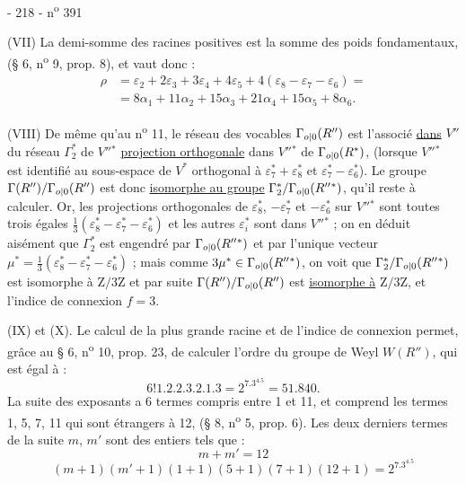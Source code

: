 - 218 - \hfill n\textsuperscript{o} 391

(VII) La demi-somme des racines positives est la somme des poids fondamentaux, (§ 6, n\textsuperscript{o} 9, prop. 8), et vaut donc :
\[
\begin{aligned}
\rho&=\varepsilon_2+2\varepsilon_3+3\varepsilon_4+4\varepsilon_5+4(\varepsilon_8-\varepsilon_7-\varepsilon_6)=\\
&=8\alpha_1+11\alpha_2+15\alpha_3+21\alpha_4+15\alpha_5+8\alpha_6.
\end{aligned}
\]

(VIII) De même qu'au n\textsuperscript{o} 11, le réseau des vocables $\Gamma_{\relax{o|0}}(R'')$ est l'associé \uline{dans} $V''$ du réseau $\Gamma_2^*$ de $V''{}^*$ \uline{projection orthogonale} dans $V''{}^*$ de $\Gamma_{\relax{o|0}}(R^*)$, (lorsque $V''{}^*$ est identifié au sous-espace de $V^*$ orthogonal à $\varepsilon_7^*+\varepsilon_8^*$ et $\varepsilon_7^*-\varepsilon_6^*$). Le groupe $\Gamma(R'')/\Gamma_{\relax{o|0}}(R'')$ est donc \uline{isomorphe au groupe} $\Gamma_2^*/\Gamma_{\relax{o|0}}(R''{}^*)$, qu'il reste à calculer. Or, les projections orthogonales de $\varepsilon_8^*$, $-\varepsilon_7^*$ et $-\varepsilon_6^*$ sur $V''{}^*$ sont toutes trois égales $\frac13(\varepsilon_8^*-\varepsilon_7^*-\varepsilon_6^*)$ et les autres $\varepsilon_i^*$ sont dans $V''{}^*$ ; on en déduit aisément que $\Gamma_2^*$ est engendré par $\Gamma_{\relax{o|0}}(R''{}^*)$ et par l'unique vecteur $\mu^*=\frac13(\varepsilon_8^*-\varepsilon_7^*-\varepsilon_6^*)$ ; mais comme $3\mu^*\in\Gamma_{\relax{o|0}}(R''{}^*)$, on voit que $\Gamma_2^*/\Gamma_{\relax{o|0}}(R''{}^*)$ est isomorphe à $\mathrm Z/3\mathrm Z$ et par suite $\Gamma(R'')/\Gamma_{\relax{o|0}}(R'')$ est \uline{isomorphe à} $\mathrm Z/3\mathrm Z$, et l'indice de connexion $f=3$.

(IX) et (X). Le calcul de la plus grande racine et de l'indice de connexion permet, grâce au § 6, n\textsuperscript{o} 10, prop. 23, de calculer l'ordre du groupe de Weyl $W(R'')$, qui est égal à :
\[
6!1.2.2.3.2.1.3=2^7.3^4.5=51.840.
\]
La suite des exposants a 6 termes compris entre 1 et 11, et comprend les termes 1, 5, 7, 11 qui sont étrangers à 12, (§ 8, n\textsuperscript{o} 5, prop. 6). Les deux derniers termes de la suite $m$, $m'$ sont des entiers tels que :
\[
m+m'=12
\]
\[
(m+1)(m'+1)(1+1)(5+1)(7+1)(12+1)=2^7.3^4.5
\]

